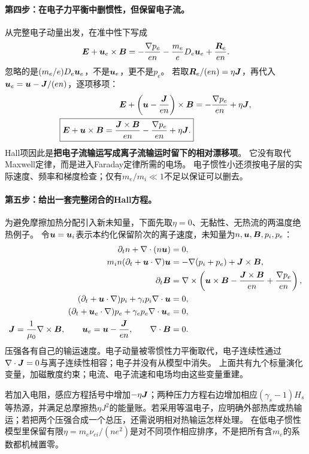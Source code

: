 \paragraph{第四步：在电子力平衡中删惯性，但保留电子流。}
从完整电子动量出发，在准中性下写成
\begin{equation}
 \bm{E}+\bm{u}_e\times\bm{B}
 =-\frac{\nabla p_e}{en}-\frac{m_e}{e}D_e\bm{u}_e+\frac{\bm{R}_e}{en}.
\end{equation}
忽略的是$(m_e/e)D_e\bm{u}_e$，不是$\bm{u}_e$，更不是$p_e$。
若取$\bm{R}_e/(en)=\eta\bm{J}$，再代入$\bm{u}_e=\bm{u}-\bm{J}/(en)$，逐项移项：
\begin{align}
 \bm{E}+\left(\bm{u}-\frac{\bm{J}}{en}\right)\times\bm{B}
 &=-\frac{\nabla p_e}{en}+\eta\bm{J},\\
 \boxed{\bm{E}+\bm{u}\times\bm{B}
 =\frac{\bm{J}\times\bm{B}}{en}-\frac{\nabla p_e}{en}+\eta\bm{J}.}
 \label{eq:tutorial-hall-origin}
\end{align}
Hall项因此是\textbf{把电子流输运写成离子流输运时留下的相对漂移项}。
它没有取代Maxwell定律，而是进入Faraday定律所需的电场。
电子惯性小还须按电子层的实际速度、频率和梯度检查；仅有$m_e/m_i\ll1$不足以保证可以删去。

\paragraph{第五步：给出一套完整闭合的Hall方程。}
为避免摩擦加热分配引入新未知量，下面先取$\eta=0$、无黏性、无热流的两温度绝热例子。
令$\bm{u}=\bm{u}_i$表示本约化保留阶次的离子速度，未知量为$n,\bm{u},\bm{B},p_i,p_e$：
\begin{align}
 \partial_t n+\nabla\cdot(n\bm{u})&=0,\\
 m_in(\partial_t+\bm{u}\cdot\nabla)\bm{u}
 &=-\nabla(p_i+p_e)+\bm{J}\times\bm{B},\\
 \partial_t\bm{B}
 &=\nabla\times\left(\bm{u}\times\bm{B}-\frac{\bm{J}\times\bm{B}}{en}
                         +\frac{\nabla p_e}{en}\right),\\
 (\partial_t+\bm{u}\cdot\nabla)p_i+\gamma_i p_i\nabla\cdot\bm{u}&=0,\\
 (\partial_t+\bm{u}_e\cdot\nabla)p_e+\gamma_e p_e\nabla\cdot\bm{u}_e&=0,\\
 \bm{J}=\frac1{\mu_0}\nabla\times\bm{B},\qquad
 \bm{u}_e=\bm{u}-\frac{\bm{J}}{en},\qquad \nabla\cdot\bm{B}&=0.
 \label{eq:closed-hall-system}
\end{align}
压强各有自己的输运速度。电子动量被零惯性力平衡取代，电子连续性通过$\nabla\cdot\bm{J}=0$与离子连续性相容；电子并没有从模型中消失。
上面共有九个标量演化变量，加磁散度约束；电流、电子流速和电场均由这些变量重建。

若加入电阻，感应方程括号中增加$-\eta\bm{J}$；两种压力方程右边增加相应$(\gamma_s-1)H_s$等热源，并满足总摩擦热$\eta J^2$的能量账。若采用等温电子，应明确外部热库或热输运；若把两个压强合成一个总压，还需说明相对热输运怎样处理。
在低电子惯性模型里保留有限$\eta=m_e\nu_{ei}/(ne^2)$是对不同项作相应排序，不是把所有含$m_e$的系数都机械置零。

